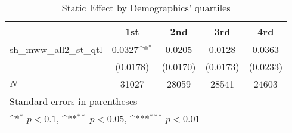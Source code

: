 \begin{table}[htbp]\centering
\def\sym#1{\ifmmode^{#1}\else\(^{#1}\)\fi}
\caption{Static Effect by Demographics' quartiles}
\begin{tabular}{l*{4}{c}}
\hline\hline
            &\multicolumn{1}{c}{1st}&\multicolumn{1}{c}{2nd}&\multicolumn{1}{c}{3rd}&\multicolumn{1}{c}{4rd}\\
\hline
sh\_mww\_all2\_st\_qtl&      0.0327\sym{*}  &      0.0205         &      0.0128         &      0.0363         \\
            &    (0.0178)         &    (0.0170)         &    (0.0173)         &    (0.0233)         \\
\hline
\(N\)       &       31027         &       28059         &       28541         &       24603         \\
\hline\hline
\multicolumn{5}{l}{\footnotesize Standard errors in parentheses}\\
\multicolumn{5}{l}{\footnotesize \sym{*} \(p<0.1\), \sym{**} \(p<0.05\), \sym{***} \(p<0.01\)}\\
\end{tabular}
\end{table}
